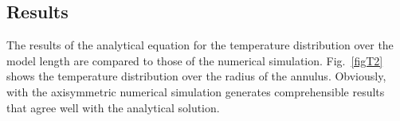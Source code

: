 \subsection{Results}

The results of the analytical equation for the temperature distribution over the model length are compared to those of the numerical simulation. Fig.~\ref{figT2} shows the temperature distribution over the radius of the annulus. Obviously, with the axisymmetric numerical simulation generates comprehensible results that agree well with the analytical solution.


